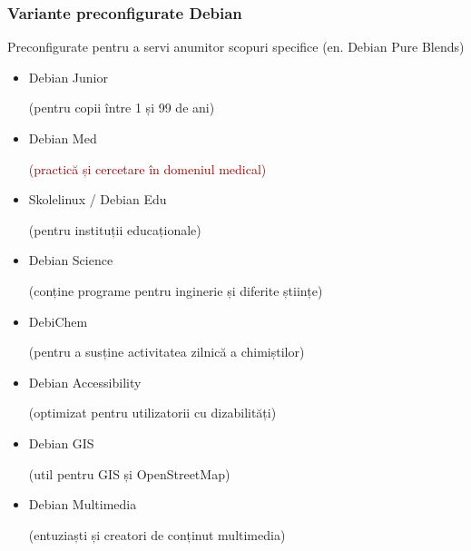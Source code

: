\documentclass[xcolor=dvipsnames]{beamer}
\begin{document}
\begin{frame}
\frametitle{Variante preconfigurate Debian}
\begin{block}
{Preconfigurate pentru a servi anumitor scopuri specifice}
(en. Debian Pure Blends)\\
\begin{itemize}
\item Debian Junior
	\begin{footnotesize}
		(pentru copii între 1 și 99 de ani)
	\end{footnotesize} 
\item Debian Med
	\begin{footnotesize}
		\textcolor{darkred}{(practică și cercetare în domeniul medical)}
	\end{footnotesize} 
\item \textcolor{fade}{Skolelinux / Debian Edu}
	\begin{footnotesize}
		\textcolor{fade}{(pentru instituții educaționale)}
	\end{footnotesize} 
\item \textcolor{fade}{Debian Science}
	\begin{footnotesize}
		\textcolor{fade}{(conține programe pentru inginerie și diferite științe)}
	\end{footnotesize} 
\item \textcolor{fade}{DebiChem}
	\begin{footnotesize}
		\textcolor{fade}{(pentru a susține activitatea zilnică a chimiștilor)}
	\end{footnotesize} 
\item \textcolor{fade}{Debian Accessibility}
	\begin{footnotesize}
		\textcolor{fade}{(optimizat pentru utilizatorii cu dizabilități)}
	\end{footnotesize} 
\item \textcolor{fade}{Debian GIS}
	\begin{footnotesize}
		\textcolor{fade}{(util pentru GIS și OpenStreetMap)}
	\end{footnotesize} 
\item \textcolor{fade}{Debian Multimedia}
	\begin{footnotesize}
		\textcolor{fade}{(entuziaști și creatori de conținut multimedia)}
	\end{footnotesize} 
\end{itemize}
\end{block}
\end{frame}
\end{document}
